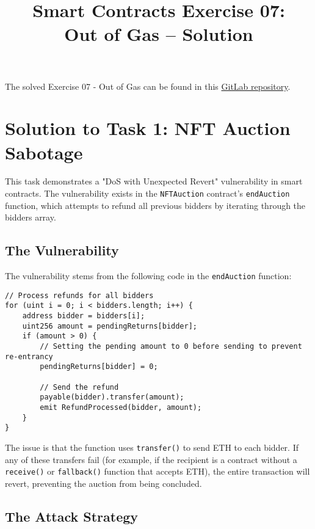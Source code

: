 \documentclass[12pt]{article}
\title{Smart Contracts Exercise 07: \\ Out of Gas -- Solution}
\author{}
\date{}
\begin{document}
\maketitle

\noindent
The solved Exercise 07 - Out of Gas can be found in this \href{https://gitlab.fel.cvut.cz/radovluk/smart-contracts-exercises/-/tree/main/07-Out-of-Gas/solution/solution-code?ref_type=heads}{GitLab repository}.

\section*{Solution to Task 1: NFT Auction Sabotage}

This task demonstrates a "DoS with Unexpected Revert" vulnerability in smart contracts. The vulnerability exists in the \texttt{NFTAuction} contract's \texttt{endAuction} function, which attempts to refund all previous bidders by iterating through the bidders array. 

\subsection*{The Vulnerability}

The vulnerability stems from the following code in the \texttt{endAuction} function:

\begin{lstlisting}[language=Solidity]
// Process refunds for all bidders
for (uint i = 0; i < bidders.length; i++) {
    address bidder = bidders[i];
    uint256 amount = pendingReturns[bidder];
    if (amount > 0) {
        // Setting the pending amount to 0 before sending to prevent re-entrancy
        pendingReturns[bidder] = 0;

        // Send the refund
        payable(bidder).transfer(amount);
        emit RefundProcessed(bidder, amount);
    }
}
\end{lstlisting}

The issue is that the function uses \texttt{transfer()} to send ETH to each bidder. If any of these transfers fail (for example, if the recipient is a contract without a \texttt{receive()} or \texttt{fallback()} function that accepts ETH), the entire transaction will revert, preventing the auction from being concluded.

\subsection*{The Attack Strategy}
\end{document}
